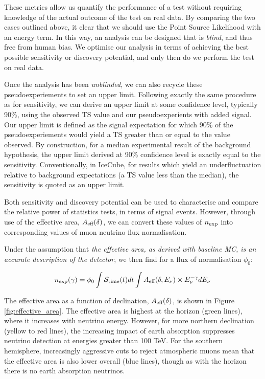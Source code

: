 These metrics allow us quantify the performance of a test without requiring knowledge of the actual outcome of the test on real data. By comparing the two cases outlined above, it clear that we should use the Point Source Likelihood with an energy term. In this way, an analysis can be designed that is \emph{blind}, and thus free from human bias. We optimise our analysis in terms of achieving the best possible sensitivity or discovery potential, and only then do we perform the test on real data. 

Once the analysis has been \emph{unblinded}, we can also recycle these pseudoexperiements to set an upper limit. Following exactly the same procedure as for sensitivity, we can derive an upper limit at some confidence level, typically 90\%, using the observed TS value and our pseudoexperients with added signal. Our upper limit is defined as the signal expectation for which 90\% of the pseudoexperiements would yield a TS greater than or equal to the value observed. By construction, for a median experimental result of the background hypothesis, the upper limit derived at 90\% confidence level is exactly equal to the sensitivity. Conventionally, in IceCube, for results which yield an underfluctuation relative to background expectations (a TS value less than the median), the sensitivity is quoted as an upper limit.

Both sensitivity and discovery potential can be used to characterise and compare the relative power of statistics tests, in terms of signal events. However, through use of the effective area,  $A_{\textup{eff}} (\delta)$, we can convert these values of $n_{\textup{exp}}$ into corresponding values of muon neutrino flux normalisation.

Under the assumption that \emph{the effective area, as derived with baseline MC, is an accurate description of the detector},  we then find for a flux of normalisation $\phi_{0}$:

\begin{equation}
n_{\textup{exp}} (\gamma) = \phi_{0} \int \mathcal{S}_{\textup{time}}(t) dt \int A_{\textup{eff}}(\delta, E_{\nu}) \times E_{\nu}^{-\gamma} dE_{\nu}
\label{eq:n_exp}
\end{equation}

The effective area as a function of declination, $A_{\textup{eff}} (\delta)$, is shown in Figure \ref{fig:effective_area}. The effective area is highest at the horizon (green lines), where it increases with neutrino energy. However, for more northern declination (yellow to red lines), the increasing impact of earth absorption suppresses neutrino detection at energies greater than 100 TeV. For the southern hemisphere, increasingly aggressive cuts to reject atmospheric muons mean that the effective area is also lower overall (blue lines), though as with the horizon there is no earth absorption neutrinos.

